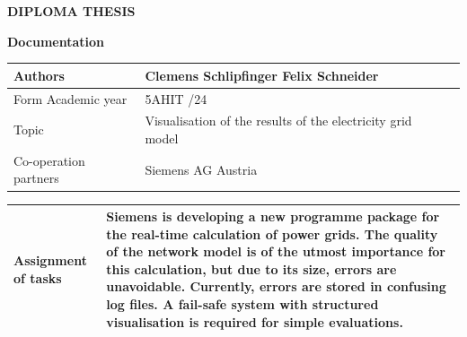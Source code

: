 \newpage
\begin{center}
\textbf{\LARGE DIPLOMA THESIS}

\textbf{Documentation}
\end{center}

\begin{tabular}{|p{53mm}|p{103mm}|@{}m{0cm}@{}}
\hline
\vspace{-0.11cm} Authors  \vspace{0.11cm} & 
\vspace{-0.11cm} Clemens Schlipfinger \newline Felix Schneider \vspace{0.11cm} & \\
\hline
\vspace{-0.11cm} Form \newline Academic year \vspace{0.11cm} & 
\vspace{-0.11cm} 5AHIT \newline 2023/24 \vspace{0.11cm} & \\
\hline
\vspace{-0.11cm} Topic \vspace{0.11cm} & 
\vspace{-0.11cm} Visualisation of the results of the electricity grid model \vspace{0.11cm} & \\
\hline
\vspace{-0.11cm} Co-operation partners \vspace{0.11cm} & 
\vspace{-0.11cm} Siemens AG Austria \vspace{0.11cm} & \\
\hline
\end{tabular}

\vspace{0.5cm}

\begin{tabular}{|p{53mm}|p{103mm}|}
\hline
\vspace{-0.11cm} Assignment of tasks \vspace{0.11cm} & 
\vspace{-0.11cm} Siemens is developing a new programme package for the real-time calculation of power grids. The quality of the network model is of the utmost importance for this calculation, but due to its size, errors are unavoidable. Currently, errors are stored in confusing log files. A fail-safe system with structured visualisation is required for simple evaluations. \vspace{0.11cm} \\
\hline
\end{tabular}

